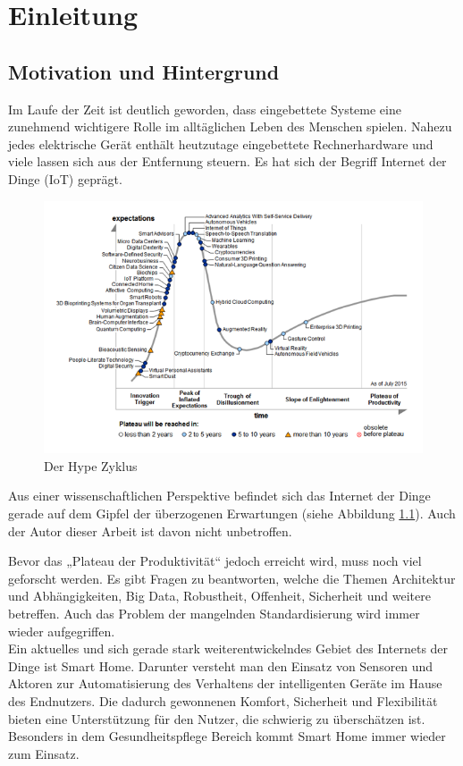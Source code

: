\chapter{Einleitung}
\section{Motivation und Hintergrund}
Im Laufe der Zeit ist deutlich geworden, dass eingebettete Systeme eine zunehmend wichtigere Rolle im alltäglichen Leben des Menschen spielen. Nahezu jedes elektrische Gerät enthält heutzutage eingebettete Rechnerhardware und viele lassen sich aus der Entfernung steuern. Es hat sich der Begriff Internet der Dinge (IoT) geprägt.

\begin{figure}[h]
	\centering
	\includegraphics{bilder/hype}
	\caption{Der Hype Zyklus \cite{hype}}
	\label{fig:hype}
\end{figure}

Aus einer wissenschaftlichen Perspektive befindet sich das Internet der Dinge gerade auf dem Gipfel der überzogenen Erwartungen (siehe Abbildung \ref{fig:hype}). Auch der Autor dieser Arbeit ist davon nicht un­be­trof­fen.

Bevor das „Plateau der Produktivität“ jedoch erreicht wird, muss noch viel geforscht werden. Es gibt Fragen zu beantworten, welche die Themen Architektur und Abhängigkeiten, Big Data, Robustheit, Offenheit, Sicherheit und weitere betreffen. Auch das Problem der mangelnden Standardisierung wird immer wieder aufgegriffen.\\

Ein aktuelles und sich gerade stark weiterentwickelndes Gebiet des Internets der Dinge ist Smart Home. Darunter versteht man den Einsatz von Sensoren und Aktoren zur Automatisierung des Verhaltens der intelligenten Geräte im Hause des Endnutzers. Die dadurch gewonnenen Komfort, Sicherheit und Flexibilität bieten eine Unterstützung für den Nutzer, die schwierig zu überschätzen ist. Besonders in dem Gesundheitspflege Bereich kommt Smart Home immer wieder zum Einsatz.\\


